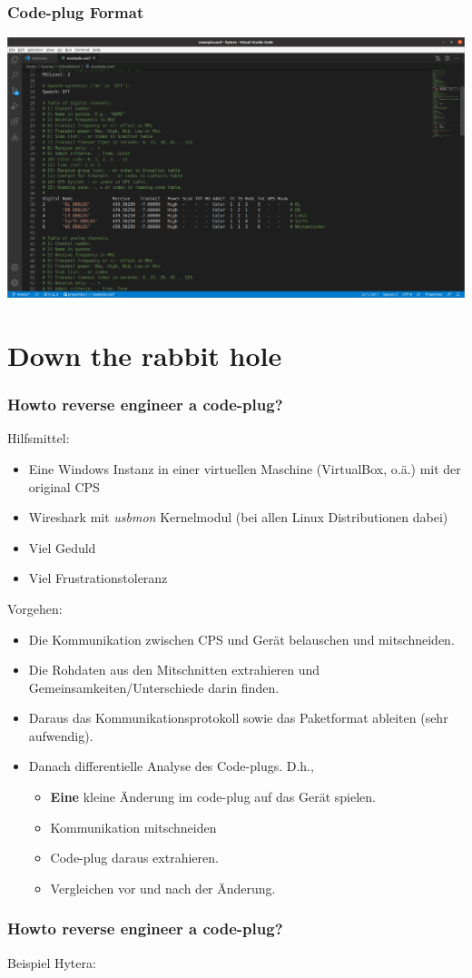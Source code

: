 \documentclass[aspectratio=169]{beamer}
\begin{document}
\begin{frame} \frametitle{Code-plug Format}
\begin{center}
 \includegraphics[width=0.9\linewidth]{../fig/qdmr-codeplug-format.png}
\end{center}
\end{frame}


\section{Down the rabbit hole}
\begin{frame} \frametitle{Howto reverse engineer a code-plug?}
 Hilfsmittel:
 \begin{itemize}
  \item Eine Windows Instanz in einer virtuellen Maschine (VirtualBox, o.ä.) mit der original CPS
  \item Wireshark mit \emph{usbmon} Kernelmodul (bei allen Linux Distributionen dabei)
  \item Viel Geduld
  \item Viel Frustrationstoleranz
 \end{itemize}
 Vorgehen:
 \begin{itemize}
  \item Die Kommunikation zwischen CPS und Gerät belauschen und mitschneiden.
  \item Die Rohdaten aus den Mitschnitten extrahieren und Gemeinsamkeiten/Unterschiede darin finden.
  \item Daraus das Kommunikationsprotokoll sowie das Paketformat ableiten (sehr aufwendig).
  \item Danach differentielle Analyse des Code-plugs. D.h., 
  \begin{itemize}
    \item \textbf{Eine} kleine Änderung im code-plug auf das Gerät spielen.
    \item Kommunikation mitschneiden
    \item Code-plug daraus extrahieren.
    \item Vergleichen vor und nach der Änderung.
  \end{itemize}
 \end{itemize}
\end{frame}

\begin{frame}\frametitle{Howto reverse engineer a code-plug?}
Beispiel Hytera:
\begin{verbatim}
 
\end{verbatim}
\end{frame}
\end{document}
